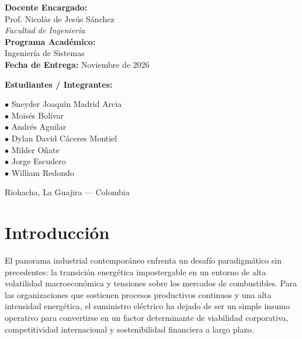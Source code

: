\documentclass[11pt,a4paper]{article}
\begin{document}
\begin{titlepage}
    \begin{minipage}[t]{0.45\textwidth}
        \textbf{\large Docente Encargado:}\\[0.15cm]
        {\normalsize Prof. Nicolás de Jesús Sánchez}\\[0.1cm]
        \textit{\small Facultad de Ingeniería}\\[0.5cm]
        \textbf{\large Programa Académico:}\\[0.15cm]
        {\normalsize Ingeniería de Sistemas}\\[0.1cm]
        \textbf{\small Fecha de Entrega:} Noviembre de 2026
    \end{minipage}
    \hfill
    \begin{minipage}[t]{0.50\textwidth}
        \textbf{\large Estudiantes / Integrantes:}\\[0.15cm]
        {\small
        $\bullet$ Sneyder Joaquín Madrid Arcia\\
        $\bullet$ Moisés Bolívar\\
        $\bullet$ Andrés Aguilar\\
        $\bullet$ Dylan David Cáceres Montiel\\
        $\bullet$ Milder Oñate\\
        $\bullet$ Jorge Escudero\\
        $\bullet$ William Redondo\par
        }
    \end{minipage}
    
    \vfill
    {\small Riohacha, La Guajira --- Colombia \par}
\end{titlepage}

\newpage
\tableofcontents
\newpage

\section{Introducción}
El panorama industrial contemporáneo enfrenta un desafío paradigmático sin precedentes: la transición energética impostergable en un entorno de alta volatilidad macroeconómica y tensiones sobre los mercados de combustibles. Para las organizaciones que sostienen procesos productivos continuos y una alta intensidad energética, el suministro eléctrico ha dejado de ser un simple insumo operativo para convertirse en un factor determinante de viabilidad corporativa, competitividad internacional y sostenibilidad financiera a largo plazo.
\end{document}
